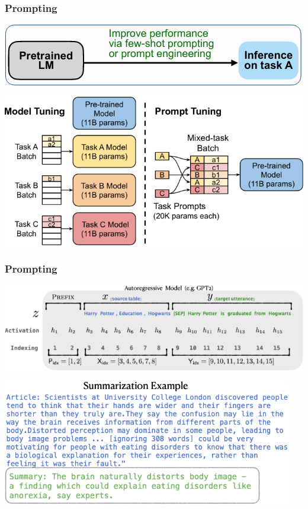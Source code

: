 \documentclass{beamer}
\begin{document}
\begin{frame}
    \frametitle{Prompting \cite{scale_prefix_tuning}}
    \begin{center}
        \includegraphics[scale=1.5]{img/zero_shot_method1.png}
    \end{center}
    \begin{center}
        \includegraphics[scale=1.3]{img/tuning_vs_prompt.png}
    \end{center}
\end{frame}

\begin{frame}
    \frametitle{Prompting \cite{prefix_tuning}}
    \begin{center}
        \includegraphics[scale=1.7]{img/prefix_models_decoder.png}
    \end{center}
    \begin{center}
        \includegraphics[scale=1.5]{img/prefix_models_decoder_example.png}
    \end{center}
\end{frame}
\end{document}
